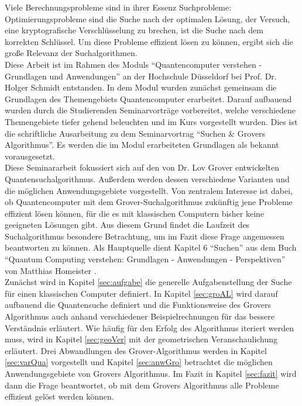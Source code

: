 Viele Berechnungsprobleme sind in ihrer Essenz Suchprobleme: Optimierungsprobleme sind die Suche nach der optimalen Lösung, der Versuch, eine kryptografische Verschlüsselung zu brechen, ist die Suche nach dem korrekten Schlüssel. Um diese Probleme effizient lösen zu können, ergibt sich die große Relevanz der Suchalgorithmen.
\\
Diese Arbeit ist im Rahmen des Moduls “Quantencomputer verstehen - Grundlagen und Anwendungen” an der Hochschule Düsseldorf bei Prof. Dr. Holger Schmidt entstanden. In dem Modul wurden zunächst gemeinsam die Grundlagen des Themengebiets Quantencomputer erarbeitet. Darauf aufbauend wurden durch die Studierenden Seminarvorträge vorbereitet, welche verschiedene Themengebiete tiefer gehend beleuchten und im Kurs vorgestellt wurden. Dies ist die schriftliche Ausarbeitung zu dem Seminarvortrag “Suchen \& Grovers Algorithmus”. Es werden die im Modul erarbeiteten Grundlagen als bekannt vorausgesetzt.
\newline
\\
Diese Seminararbeit fokussiert sich auf den von Dr. Lov Grover entwickelten Quantensuchalgorithmus. Außerdem werden dessen verschiedene Varianten und die möglichen Anwendungsgebiete vorgestellt.
Von zentralem Interesse ist dabei, ob Quantencomputer mit dem Grover-Suchalgorithmus zukünftig jene Probleme effizient lösen können, für die es mit klassischen Computern bisher keine geeigneten Lösungen gibt. 
Aus diesem Grund findet die Laufzeit des Suchalgorithmus besondere Betrachtung, um im Fazit diese Frage angemessen beantworten zu können. 
Als Hauptquelle dient Kapitel 6 “Suchen” aus dem Buch “Quantum Computing verstehen: Grundlagen - Anwendungen - Perspektiven” von Matthias Homeister \cite[S. 137 - 167]{Ho17}.
\newline
\\
Zunächst wird in Kapitel \ref{sec:aufgabe} die generelle Aufgabenstellung der Suche für einen klassischen Computer definiert.
In Kapitel \ref{sec:groAL} wird darauf aufbauend die Quantensuche definiert und die Funktionsweise des Grovers Algorithmus auch anhand verschiedener Beispielrechnungen für das bessere Verständnis erläutert.
Wie häufig für den Erfolg des Algorithmus iteriert werden muss, wird in Kapitel \ref{sec:geoVer} mit der geometrischen Veranschaulichung erläutert.
Drei Abwandlungen des Grover-Algorithmus werden in Kapitel \ref{sec:varQua} vorgestellt und Kapitel \ref{sec:anwGro} betrachtet die möglichen Anwendungsgebiete von Grovers Algorithmus.
Im Fazit in Kapitel \ref{sec:fazit} wird dann die Frage beantwortet, ob mit dem Grovers Algorithmus alle Probleme effizient gelöst werden können.